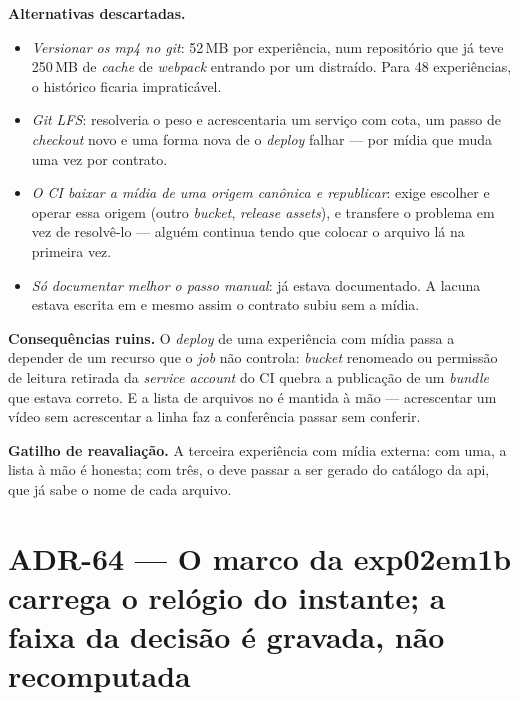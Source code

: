 \textbf{Alternativas descartadas.}
\begin{itemize}
  \item \emph{Versionar os \emph{mp4} no git}: 52\,MB por experiência, num
    repositório que já teve 250\,MB de \emph{cache} de \emph{webpack} entrando
    por um  distraído. Para 48 experiências, o histórico ficaria
    impraticável.
  \item \emph{Git LFS}: resolveria o peso e acrescentaria um serviço com cota,
    um passo de \emph{checkout} novo e uma forma nova de o \emph{deploy}
    falhar --- por mídia que muda uma vez por contrato.
  \item \emph{O CI baixar a mídia de uma origem canônica e republicar}: exige
    escolher e operar essa origem (outro \emph{bucket}, \emph{release assets}),
    e transfere o problema em vez de resolvê-lo --- alguém continua tendo que
    colocar o arquivo lá na primeira vez.
  \item \emph{Só documentar melhor o passo manual}: já estava documentado. A
    lacuna estava escrita em  e mesmo assim o contrato subiu
    sem a mídia.
\end{itemize}

\textbf{Consequências ruins.} O \emph{deploy} de uma experiência com mídia
passa a depender de um recurso que o \emph{job} não controla: \emph{bucket}
renomeado ou permissão de leitura retirada da \emph{service account} do CI
quebra a publicação de um \emph{bundle} que estava correto. E a lista de
arquivos no  é mantida à mão --- acrescentar um vídeo
sem acrescentar a linha faz a conferência passar sem conferir.

\textbf{Gatilho de reavaliação.} A terceira experiência com mídia externa: com
uma, a lista à mão é honesta; com três, o  deve passar
a ser gerado do catálogo da api, que já sabe o nome de cada arquivo.

\section{ADR-64 --- O marco da exp02em1b carrega o relógio do instante; a faixa
da decisão é gravada, não recomputada}
\label{adr:marco-com-relogio}

